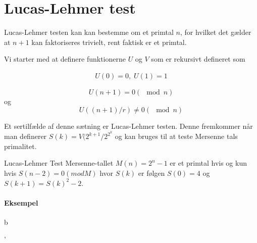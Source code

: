 
\section{Lucas-Lehmer test}




Lucas-Lehmer testen kan kan bestemme om et primtal $n$, for hvilket det
gælder at $n + 1$ kan faktoriseres trivielt, rent faktisk er et
primtal. 


Vi starter med at definere funktionerne $U$ og $V$ som er rekursivt
defineret som 

\begin{align*}
U(0) = 0,\;U(1) = 1
\end{align*}


\begin{theorem}

\begin{equation}
U(n+1) = 0 (\mod n)
\end{equation}
og
\begin{equation}
U((n+1)/r) \neq 0 (\mod n)
\end{equation}

\end{theorem}

Et sertilfælde af denne sætning er Lucas-Lehmer testen. Denne
fremkommer når man definerer $S(k) = V(2^{k+1}/2^{2^k}$ og kan bruges
til at teste Mersenne tals primalitet.

\begin{theorem}{Lucas-Lehmer Test}
Mersenne-tallet $M(n) = 2^n -1$ er et primtal hvis og kun hvis $S(n -
2) = 0 (mod M)$ hvor $S(k)$ er følgen $S(0) = 4$ og $S(k + 1) = S(k)^2
- 2$.
\end{theorem}

\paragraph{Eksempel}

b

'%
